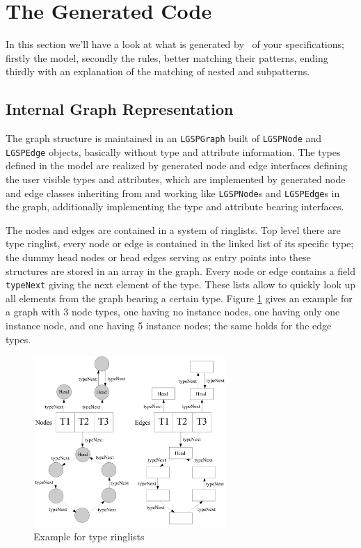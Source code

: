 \section{The Generated Code}\label{sec:generatedcode}
In this section we'll have a look at what is generated by \GrG~of your specifications; firstly the model, secondly the rules, better matching their patterns, ending thirdly with an explanation of the matching of nested and subpatterns.

\subsection*{Internal Graph Representation}
The graph structure is maintained in an \texttt{LGSPGraph} built of \texttt{LGSPNode} and \texttt{LGSPEdge} objects, basically without type and attribute information.
The types defined in the model are realized by generated node and edge interfaces defining the user visible types and attributes, which are implemented by generated node and edge classes inheriting from and working like \texttt{LGSPNode}s and \texttt{LGSPEdge}s in the graph, additionally implementing the type and attribute bearing interfaces.

The nodes and edges are contained in a system of ringlists.
Top level there are type ringlist, every node or edge is contained in the linked list of its specific type; the dummy head nodes or head edges serving as entry points into these structures are stored in an array in the graph.
Every node or edge contains a field \texttt{typeNext} giving the next element of the type.
These lists allow to quickly look up all elements from the graph bearing a certain type.
Figure \ref{figtyperinglists} gives an example for a graph with 3 node types, one having no instance nodes, one having only one instance node, and one having 5 instance nodes; the same holds for the edge types.

\begin{figure}[htbp]
  \centering
  \includegraphics[width=0.65\textwidth]{fig/TypeRinglists}
  \caption{Example for type ringlists}
  \label{figtyperinglists}
\end{figure}

